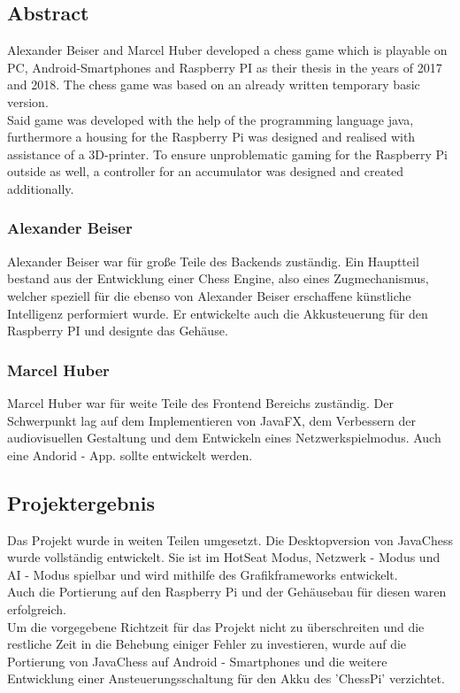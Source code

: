 \documentclass[12pt,a4paper]{article}
\begin{document}
	\subsection{Abstract}
	
	Alexander Beiser and Marcel Huber developed a chess game which is playable on PC, Android-Smartphones and Raspberry PI as their thesis in the years of 2017 and 2018. The chess game was based on an already written temporary basic version.\\
Said game was developed with the help of the programming language java, furthermore a housing for the Raspberry Pi was designed and realised with assistance of a 3D-printer. To ensure unproblematic gaming for the Raspberry Pi outside as well, a controller for an accumulator was designed and created additionally.

	\subsubsection{Alexander Beiser}
	Alexander Beiser war für große Teile des Backends zuständig. Ein Hauptteil bestand aus der Entwicklung einer Chess Engine, also eines Zugmechanismus, welcher speziell für die ebenso von Alexander Beiser erschaffene künstliche Intelligenz performiert wurde. Er entwickelte auch die Akkusteuerung für den Raspberry PI und designte das Gehäuse.
	
	\subsubsection{Marcel Huber}
	Marcel Huber war für weite Teile des Frontend Bereichs zuständig. Der Schwerpunkt lag auf dem Implementieren von JavaFX, dem Verbessern der audiovisuellen Gestaltung und dem Entwickeln eines Netzwerkspielmodus. Auch eine Andorid - \ac{App.} sollte entwickelt werden.
	
 \subsection{Projektergebnis}

	Das Projekt wurde in weiten Teilen umgesetzt. Die Desktopversion von JavaChess wurde vollständig entwickelt. Sie ist im HotSeat Modus, Netzwerk - Modus und AI - Modus spielbar und wird mithilfe des Grafikframeworks entwickelt.\\ Auch die Portierung auf den Raspberry Pi und der Gehäusebau für diesen waren erfolgreich.\\
Um die vorgegebene Richtzeit für das Projekt nicht zu überschreiten und die restliche Zeit in die Behebung einiger Fehler zu investieren, wurde auf die Portierung von JavaChess auf Android - Smartphones und die weitere Entwicklung einer Ansteuerungsschaltung für den Akku des 'ChessPi' verzichtet.
\end{document}
